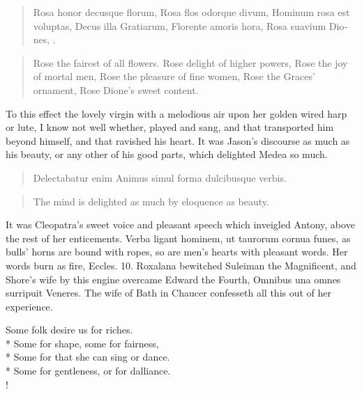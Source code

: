 \begin{latin}
\begin{verse}
Rosa honor decusque florum,
Rosa flos odorque divum,
Hominum rosa est voluptas,
Decus illa Gratiarum,
Florente amoris hora,
Rosa suavium Diones, \etc{}.
\end{verse}
\end{latin}
\translationrule%
\begin{verse}%
Rose the fairest of all flowers.
Rose delight of higher powers,
Rose the joy of mortal men,
Rose the pleasure of fine women,
Rose the Graces' ornament,
Rose Dione's sweet content.
\end{verse}%

To this effect the lovely virgin with a melodious air upon her golden
wired harp or lute, I know not well whether, played and sang, and that
transported him beyond himself, and that ravished his heart. It was
Jason's discourse as much as his beauty, or any other of his good
parts, which delighted Medea so much.

\begin{latin}
\begin{verse}
Delectabatur enim
Animus simul forma dulcibusque verbis.
\end{verse}
\end{latin}
\translationrule%
\begin{verse}%
The mind is delighted
as much by eloquence as beauty.
\end{verse}%

It was Cleopatra's sweet voice and pleasant speech which inveigled
Antony, above the rest of her enticements. Verba ligant hominem, ut
taurorum cornua funes, as bulls' horns are bound with ropes, so are
men's hearts with pleasant words. Her words burn as fire, Eccles. 
10. Roxalana bewitched Suleiman the Magnificent, and Shore's wife by
this engine overcame Edward the Fourth, Omnibus una omnes
surripuit Veneres. The wife of Bath in Chaucer confesseth all this out
of her experience.
%
{\gothfont%
\begin{versewithlinenos}{2}{1}{1}%
Some folk desire us for riches.\\*
Some for shape, some for fairness,\\*
Some for that she can sing or dance.\\*
Some for gentleness, or for dalliance.\\!
\end{versewithlinenos}%
}%

